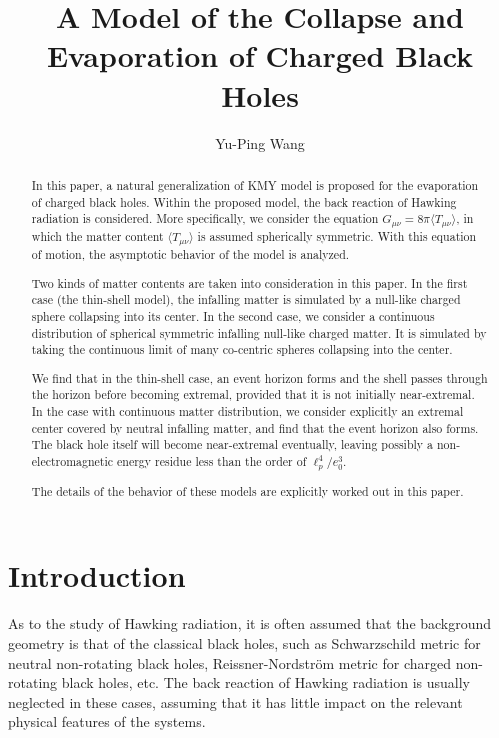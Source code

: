 \documentclass[letterpaper,12pt]{article}
\begin{document}
\title{\textbf{A Model of the Collapse and Evaporation of Charged Black Holes}}

\renewcommand*{\Authfont}{\normalsize}  
\author[1]{Yu-Ping Wang }
\date{}
\maketitle
\begin{abstract}
In this paper, a natural generalization of KMY model is proposed for the evaporation of charged black holes. Within the proposed model, the back reaction of Hawking radiation is considered.  More specifically, we consider the equation $G_{\mu\nu} = 8\pi \langle T_{\mu\nu}\rangle$, in which the matter content $\langle T_{\mu\nu}\rangle$ is assumed spherically symmetric. With this equation of motion, the asymptotic behavior of the model is analyzed.  

Two kinds of matter contents are taken into consideration in this paper. In the first case (the thin-shell model), the infalling matter is simulated by a null-like charged sphere collapsing into its center. In the second case, we consider a continuous distribution of spherical symmetric infalling null-like charged matter. It is simulated by taking the continuous limit of many co-centric spheres collapsing into the center.

We find that in the thin-shell case, an event horizon forms and the shell passes through the horizon before becoming extremal, provided that it is not initially near-extremal. In the case with continuous matter distribution, we consider explicitly an extremal center covered by neutral infalling matter, and find that the event horizon also forms. The black hole itself will become near-extremal eventually, leaving possibly a non-electromagnetic energy residue less than the order of $\ell_{p}^{4}/e_{0}^{3}$.

The details of the behavior of these models are explicitly worked out in this paper.
\end{abstract}


\section{Introduction} \paragraph{ }
As to the study of Hawking radiation, it is often assumed that the background geometry is that of the classical black holes, such as Schwarzschild metric for neutral non-rotating black holes, Reissner-Nordström metric for charged non-rotating black holes, etc. The back reaction of Hawking radiation is usually neglected in these cases, assuming that it has little impact on the relevant physical features of the systems.\cite{ hawking1975particle,parker2009quantum, siahaan2010semiclassical, triyanta2013hawking}
%
\end{document}
